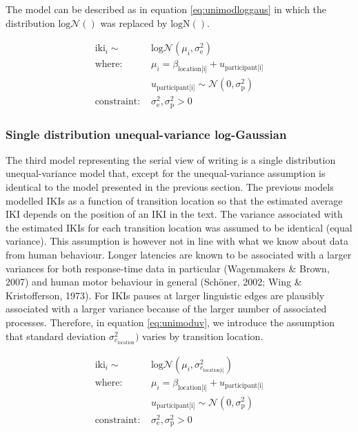 \documentclass[
  man,floatsintext]{apa7}
\begin{document}
The model can be described as in equation \ref{eq:unimodloggaus} in which the distribution \(\text{log}\mathcal{N}()\) was replaced by \(\text{logN}()\).

\begin{equation}
\begin{aligned}
\label{eq:unimodloggaus}
\text{iki}_i \sim\text{ } & \text{log}\mathcal{N}(\mu_i, \sigma_\text{e}^2) \\
\text{where: } &
\mu_i = \beta_\text{location[i]} + u_\text{participant[i]}\\
& u_\text{participant[i]} \sim \mathcal{N}(0, \sigma_\text{p}^2) \\
\text{constraint: } & \sigma_\text{e}^2, \sigma_\text{p}^2>0
\end{aligned}
\end{equation}

\hypertarget{single-distribution-unequal-variance-log-gaussian}{%
\subsubsection{Single distribution unequal-variance log-Gaussian}\label{single-distribution-unequal-variance-log-gaussian}}

The third model representing the serial view of writing is a single distribution unequal-variance model that, except for the unequal-variance assumption is identical to the model presented in the previous section. The previous models modelled IKIs as a function of transition location so that the estimated average IKI depends on the position of an IKI in the text. The variance associated with the estimated IKIs for each transition location was assumed to be identical (equal variance). This assumption is however not in line with what we know about data from human behaviour. Longer latencies are known to be associated with a larger variances for both response-time data in particular (Wagenmakers \& Brown, 2007) and human motor behaviour in general (Schöner, 2002; Wing \& Kristofferson, 1973). For IKIs pauses at larger linguistic edges are plausibly associated with a larger variance because of the larger number of associated processes. Therefore, in equation \ref{eq:unimoduv}, we introduce the assumption that standard deviation \(\sigma_{e_\text{location}}^2)\) varies by transition location.

\begin{equation}
\begin{aligned}
\label{eq:unimoduv}
\text{iki}_i \sim\text{ } & \text{log}\mathcal{N}(\mu_i, \sigma_{e_\text{location[i]}}^2) \\
\text{where: } & \mu_i = \beta_\text{location[i]} + u_\text{participant[i]}\\
 & u_\text{participant[i]} \sim \mathcal{N}(0, \sigma_\text{p}^2) \\
 \text{constraint: } & \sigma_\text{e}^2, \sigma_\text{p}^2>0
\end{aligned}
\end{equation}
\end{document}
